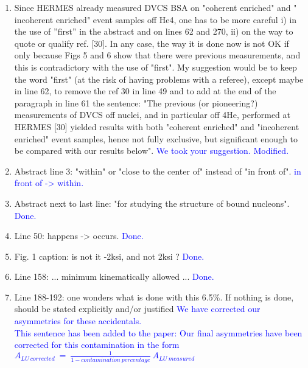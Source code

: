 \documentclass[a4paper,11pt,twoside]{article}
\begin{document}
\begin{enumerate}

\item Since HERMES already measured DVCS BSA on "coherent enriched" and "
   incoherent enriched" event samples off He4, one has to be more careful i) in 
      the use of ''first'' in the abstract and on lines 62 and 270, ii) on the 
      way to quote or qualify ref. [30]. In any case, the way it is done now is 
      not OK if only because Figs 5 and 6 show that there were previous 
      measurements, and this is contradictory with the use of "first". My 
      suggestion would be to keep the word "first" (at the risk of having 
      problems with a referee), except maybe in line 62, to remove the ref 30 
      in line 49 and to add at the end of the paragraph in line 61 the 
      sentence: "The previous (or pioneering?) measurements of DVCS off nuclei, 
      and in particular off 4He, performed at HERMES [30] yielded results with 
      both "coherent enriched" and "incoherent enriched" event samples, hence 
      not fully exclusive, but significant enough to be compared with our 
      results below".
\textcolor{blue}{We took your suggestion. Modified.}

   \item Abstract line 3: "within" or "close to the center of" instead of "in 
      front of".
\textcolor{blue}{in front of -> within.}

   \item Abstract next to last line: "for studying the structure of bound 
      nucleons".
\textcolor{blue}{Done.}

   \item Line 50: happens -> occurs.
\textcolor{blue}{Done.}

   \item Fig. 1 caption: is not it -2ksi, and not 2ksi ?
\textcolor{blue}{Done.}

   \item Line 158: ... minimum kinematically allowed ...
\textcolor{blue}{Done.}

   \item Line 188-192: one wonders what is done with this 6.5\%. If nothing is 
      done, should be stated explicitly and/or justified
\textcolor{blue}{We have corrected our asymmetries for these accidentals.
      }\\
       \textcolor{blue}{This sentence has been added to the paper: Our final 
       asymmetries have been corrected for this contamination in the form
      $A_{LU~corrected}~=~\frac{1}{1-contamination~percentage}~A_{LU~measured}$ 
      }


\end{enumerate}
\end{document}
